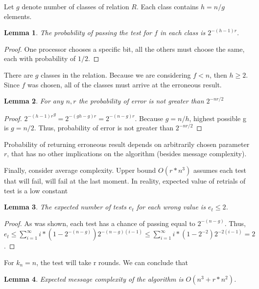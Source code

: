 \documentclass{article}
\newtheorem{lemma}{Lemma}
\begin{document}
Let $g$ denote number of classes of relation $R$. Each class contains $h = n/g$ elements.
\begin{lemma}
The probability of passing the test for $f$ in each class is $2^{-(h-1)r}$.
\end{lemma}
\begin{proof}
One processor chooses a specific bit, all the others must choose the same, each with probability of $1/2$.
\end{proof}
There are $g$ classes in the relation. Because we are considering $f < n$, then $h \geq 2$. Since $f$ was chosen, all of the classes must arrive at the erroneous result.

\begin{lemma}
For any $n, r$ the probability of error is not greater than $2^{-n r/2}$
\end{lemma}
\begin{proof}
${2^{-(h-1)r}}^g = 2^{-(gh-g)r} = 2^{-(n-g)r}$. Because $g = n/h$, highest possible g is $g = n/2$. Thus, probability of error is not greater than $2^{-nr/2}$
\end{proof}

Probability of returning erroneous result depends on arbitrarily chosen parameter $r$, that has no other implications on the algorithm (besides message complexity).

Finally, consider average complexity. Upper bound $O(r*n^3)$ assumes each test that will fail, will fail at the last moment. In reality, expected value of retrials of test is a low constant

\begin{lemma}
The expected number of tests $e_t$ for each wrong value is $e_t \leq 2$.
\end{lemma}
\begin{proof}
As was shown, each test has a chance of passing equal to $2^{-(n-g)} $. Thus, $e_t \leq \sum_{i=1}^{\infty}i*{(1-2^{-(n-g)})}2^{-(n-g)(i-1)} \leq
\sum_{i=1}^{\infty}i*{(1-2^{-2})}2^{-2(i-1)} = 2$.
\end{proof}

For $k_n = n$, the test will take r rounds. We can conclude that
\begin{lemma}
Expected message complexity of the algorithm is $O(n^3 + r*n^2)$.
\end{lemma}

\printbibliography
\end{document}
